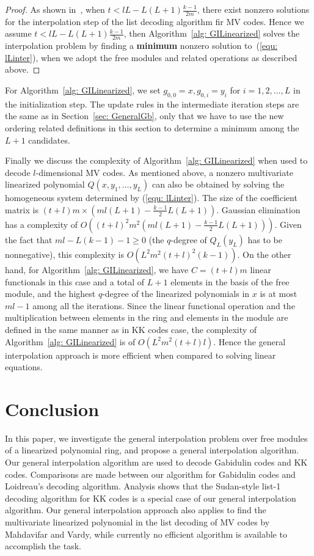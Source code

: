 \documentclass[11pt,onecolumn,draftcls]{IEEEtran}
\begin{document}
\begin{proof}
As shown in~\cite{mahdavifar_isit10}, when $t < lL - L(L+1) \frac{k-1}{2m}$, there exist nonzero solutions for the interpolation step of the list decoding algorithm fir MV codes. Hence we assume $t < lL - L(L+1) \frac{k-1}{2m}$, then Algorithm~\ref{alg: GILinearized} solves the interpolation problem by finding a \textbf{minimum} nonzero solution to~(\ref{equ: lLinter}), when we adopt the free modules and related operations as described above.
\end{proof}


For Algorithm~\ref{alg: GILinearized}, we set $g_{0,0} = x, g_{0,i} = y_i$ for $i = 1, 2,\ldots, L$ in the initialization step. The update rules in the intermediate iteration steps are the same as in Section~\ref{sec: GeneralGb}, only that we have to use the new ordering related definitions in this section to determine a minimum among the $L+1$ candidates.

Finally we discuss the complexity of Algorithm~\ref{alg: GILinearized} when used to decode $l$-dimensional MV codes. As mentioned above, a nonzero multivariate linearized polynomial $Q(x, y_1, \ldots, y_L)$ can also be obtained by solving the homogeneous system determined by (\ref{equ: lLinter}). The size of the coefficient matrix is $(t+l)m \times (ml (L+1) - \frac{k-1}{2}L(L+1))$. Gaussian elimination has a complexity of  $O((t+l)^2 m^2 (ml (L+1) - \frac{k-1}{2}L(L+1)))$. Given the fact that $ml-L(k-1)-1 \ge 0$ (the $q$-degree of $Q_L(y_L)$ has to be nonnegative), this complexity is $O(L^2 m^2 (t+l)^2 (k-1))$. On the other hand, for Algorithm~\ref{alg: GILinearized}, we have $C = (t+l)m$ linear functionals in this case and a total of $L+1$ elements in the basis of the free module, and the highest $q$-degree of the linearized polynomials in $x$ is at most $ml-1$ among all the iterations. Since the linear functional operation and the multiplication between elements in the ring and elements in the module are defined in the same manner as in KK codes case, the complexity of Algorithm~\ref{alg: GILinearized} is of $O(L^2 m^2 (t+l)l)$. Hence the general interpolation approach is more efficient when compared to solving linear equations.




\section{Conclusion} \label{sec: conclusion}
In this paper, we investigate the general interpolation problem over free modules of a linearized polynomial ring, and propose a general interpolation algorithm. Our general interpolation algorithm are used to decode Gabidulin codes and KK codes. Comparisons are made between our algorithm for Gabidulin codes and Loidreau's decoding algorithm. Analysis shows that the Sudan-style list-1 decoding algorithm for KK codes is a special case of our general interpolation algorithm. Our general interpolation approach also applies to find the multivariate linearized polynomial in the list decoding of MV codes by Mahdavifar and Vardy, while currently no efficient algorithm is available to accomplish the task.


\end{document}
